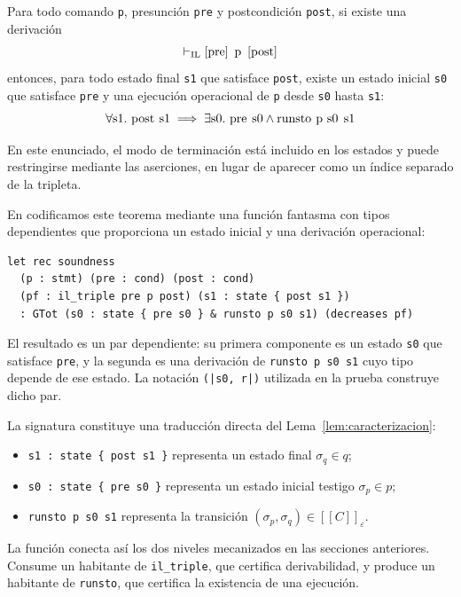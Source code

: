 \documentclass[a4paper,	11pt]{report}
\begin{document}
\begin{teorema}
Para todo comando \lstinline|p|,
presunción \lstinline|pre| y postcondición \lstinline|post|,
si existe una derivación
$$\vdash_{\mathrm{IL}} \itriple{\text{\lstinline|pre|}}{\text{\lstinline|p|}}{\text{\lstinline|post|}}$$
entonces,
para todo estado final \lstinline|s1| que satisface \lstinline|post|,
existe un estado inicial \lstinline|s0| que satisface \lstinline|pre| y una ejecución operacional de \lstinline|p| desde \lstinline|s0| hasta \lstinline|s1|:
$$\forall \text{\lstinline|s1|}. \ \text{\lstinline|post s1|} \implies \exists \text{\lstinline|s0|}. \ \text{\lstinline|pre s0|} \land \text{\lstinline|runsto p s0 s1|}$$
\end{teorema}
En este enunciado,
el modo de terminación está incluido en los estados y puede restringirse mediante las aserciones,
en lugar de aparecer como un índice separado de la tripleta.

En \fstar{} codificamos este teorema mediante una función fantasma con tipos dependientes
que proporciona un estado inicial y una derivación operacional:

\begin{lstlisting}
let rec soundness
  (p : stmt) (pre : cond) (post : cond)
  (pf : il_triple pre p post) (s1 : state { post s1 })
  : GTot (s0 : state { pre s0 } & runsto p s0 s1) (decreases pf)
\end{lstlisting}
El resultado es un par dependiente:
su primera componente es un estado \lstinline|s0| que satisface \lstinline|pre|,
y la segunda es una derivación de \lstinline|runsto p s0 s1| cuyo tipo depende de ese estado.
La notación \lstinline{(|s0, r|)} utilizada en la prueba construye dicho par.

La signatura constituye una traducción directa del Lema~\ref{lem:caracterizacion}:
\begin{itemize}
  \item \lstinline|s1 : state { post s1 }| representa un estado final $\sigma_q \in q$;
  \item \lstinline|s0 : state { pre s0 }| representa un estado inicial testigo $\sigma_p \in p$;
  \item \lstinline|runsto p s0 s1| representa la transición $(\sigma_p, \sigma_q) \in [\![C]\!]_\varepsilon$.
\end{itemize}
La función conecta así los dos niveles mecanizados en las secciones anteriores.
Consume un habitante de \lstinline|il_triple|,
que certifica derivabilidad,
y produce un habitante de \lstinline|runsto|,
que certifica la existencia de una ejecución.
\end{document}
